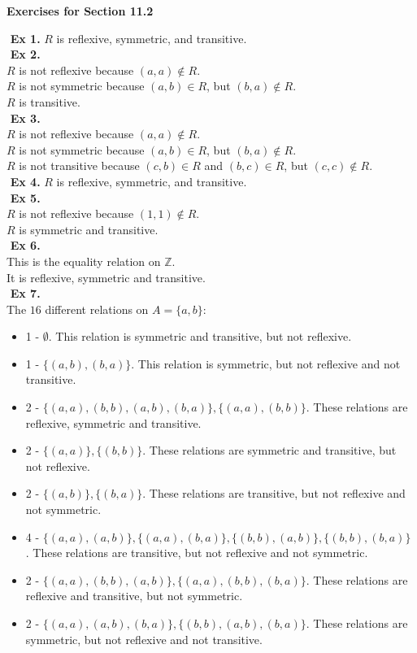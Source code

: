 \documentclass{article}
\date{}
\author{}
\begin{document}
\centerline{\textbf{Exercises for Section 11.2}}
$ $\newline
\textbf{Ex 1.} $R$ is reflexive, symmetric, and transitive.\\
$ $\newline
\textbf{Ex 2.} \\
$R$ is not reflexive because $(a,a) \not\in R$.\\
$R$ is not symmetric because $(a, b) \in R$, but $(b,a) \not\in R$.\\
$R$ is transitive.\\
$ $\newline
\textbf{Ex 3.} \\
$R$ is not reflexive because $(a,a) \not\in R$.\\
$R$ is not symmetric because $(a,b) \in R$, but $(b,a) \not\in R$.\\
$R$ is not transitive because $(c,b) \in R $ and $(b,c) \in R$, but $(c,c) \not\in R$.\\
$ $\newline
\textbf{Ex 4.} $R$ is reflexive, symmetric, and transitive.\\
$ $\newline
\textbf{Ex 5.}\\
$R$ is not reflexive because $(1,1) \not\in R$.\\
$R$ is symmetric and transitive.\\
$ $\newline
\textbf{Ex 6.}\\
This is the equality relation on $\mathbb{Z}$.\\
It is reflexive, symmetric and transitive.\\
$ $\newline
\textbf{Ex 7.}\\
The $16$ different relations on $A=\{a,b\}$:\\
\begin{itemize}
  \item 1 - $\emptyset$. This relation is symmetric and transitive, but not reflexive.
  \item 1 - $\{(a, b), (b,a)\}$. This relation is symmetric, but not reflexive and not transitive. 
  \item 2 - $\{(a,a), (b,b), (a, b), (b, a)\}, \{(a,a), (b,b)\}$. These relations are reflexive, symmetric and transitive.
  \item 2 - $\{(a,a)\}, \{(b, b)\}$. These relations are symmetric and transitive, but not reflexive.
  \item 2 - $\{(a, b)\}, \{(b,a)\}$. These relations are transitive, but not reflexive and not symmetric.
  \item 4 - $\{(a,a),(a, b)\}, \{(a,a), (b,a)\}, \{(b,b),(a,b)\}, \{(b,b),(b,a)\}$ . These relations are transitive, but not reflexive and not symmetric.  
  \item 2 - $\{(a,a), (b, b), (a, b)\},\{(a,a), (b, b), (b, a)\}$. These relations are reflexive and transitive, but not symmetric.
  \item 2 - $\{(a,a), (a, b), (b, a)\},\{(b,b), (a, b), (b, a)\}$. These relations are symmetric, but not reflexive and not transitive.
\end{itemize}
\end{document}
